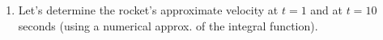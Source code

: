 \documentclass{ximera}
\begin{document}
\begin{enumerate}


\vfill

\newpage



\item Let's determine the rocket's approximate velocity at $t=1$ and at $t=10$ seconds (using a numerical approx. of the integral function).







\vspace{2cm}


\end{enumerate}
\end{document}
